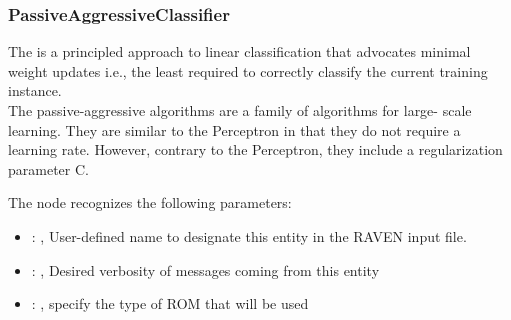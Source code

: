 \subsubsection{PassiveAggressiveClassifier}
  The                          is a principled approach to
  linear                         classification that advocates minimal weight updates i.e., the
  least required                         to correctly classify the current training instance.
  \\The passive-aggressive algorithms are a family of algorithms for                         large-
  scale learning. They are similar to the Perceptron in that they                         do not
  require a learning rate. However, contrary to the Perceptron,                         they include
  a regularization parameter C.

  The  node recognizes the following parameters:
    \begin{itemize}
      \item {}: , 
        User-defined name to designate this entity in the RAVEN input file.
      \item {}: , 
        Desired verbosity of messages coming from this entity
      \item {}: , 
        specify the type of ROM that will be used
  \end{itemize}

